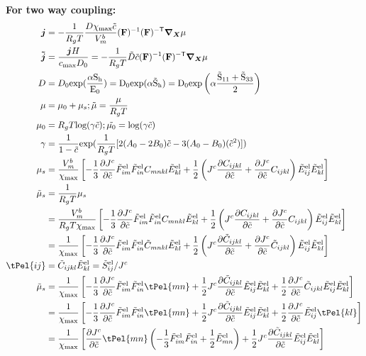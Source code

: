 \documentclass[../main.tex]{subfiles}
\begin{document}
\textbf{For two way coupling:}
\begin{align}
    \bm{j} &= - \fc{1}{R_g T} \fc{D\xmax \tc}{V^b_m} \inv{\F} \invT{\F} \nablaX \mu \\
    \bm{\td{j}} &= \frac{\bm{j} H}{\cmax D_0} =-\fc{1}{R_g T} \td{D} \tc \inv{\F} \invT{\F} \nablaX \mu \\
    D &= D_0 \rm{exp}(\fc{\alpha S_h}{E_0}) = D_0 \rm{exp}(\alpha \td{S}_h)= D_0 \rm{exp}\left(\alpha \frac{\td{S}_{11}+\td{S}_{33}}{2}\right) \\ 
    \mu &= \mu_0 + \mu_s; \td{\mu} = \frac{\mu}{R_g T} \\
    \mu_0 &= R_g T \text{log}(\gamma \td{c}); \td{\mu_0} = \text{log}(\gamma \td{c})\\
    \gamma &= \fc{1}{1-\td{c}}\text{exp}(\fc{1}{R_g T}[2(A_0 - 2B_0)\td{c} - 3(A_0 - B_0)(\td{c}^2)])\\
    \mu_s &= \fc{V_m^b}{\xmax}\left[-\fc{1}{3}\pdiff{\jc}{\tc}\tFel{im}\tFel{in}{C}_{mnkl}\tEel{kl} + \fc{1}{2}\left(\jc \pdiff{C_{ijkl}}{\tc} + \pdiff{\jc}{\tc} C_{ijkl}\right)\tEel{ij}\tEel{kl}\right] \\
    \td{\mu}_s &= \frac{1}{R_g T} \mu_s \\
        &= \fc{V_m^b}{R_g T \xmax}\left[-\fc{1}{3}\pdiff{\jc}{\tc}\tFel{im}\tFel{in}{C}_{mnkl}\tEel{kl} + \fc{1}{2}\left(\jc \pdiff{C_{ijkl}}{\tc} + \pdiff{\jc}{\tc} C_{ijkl}\right)\tEel{ij}\tEel{kl}\right] \\ 
        &= \fc{1}{\xmax}\left[-\fc{1}{3}\pdiff{\jc}{\tc}\tFel{im}\tFel{in}{\td{C}}_{mnkl}\tEel{kl} + \fc{1}{2}\left(\jc \pdiff{\td{C}_{ijkl}}{\tc} + \pdiff{\jc}{\tc} \td{C}_{ijkl}\right)\tEel{ij}\tEel{kl}\right] \\
    \tPel{ij} &= \td{C}_{ijkl} \tEel{kl} = \tSel{ij}/\jc \\
    \td{\mu}_s &= \fc{1}{\xmax}\left[-\fc{1}{3}\pdiff{\jc}{\tc}\tFel{im}\tFel{in}\tPel{mn} + \fc{1}{2}\jc \pdiff{\td{C}_{ijkl}}{\tc}\tEel{ij}\tEel{kl} + \fc{1}{2} \pdiff{\jc}{\tc} \td{C}_{ijkl}\tEel{ij}\tEel{kl}\right] \\
    &= \fc{1}{\xmax}\left[-\fc{1}{3}\pdiff{\jc}{\tc}\tFel{im}\tFel{in}\tPel{mn} + \fc{1}{2}\jc \pdiff{\td{C}_{ijkl}}{\tc}\tEel{ij}\tEel{kl} + \fc{1}{2} \pdiff{\jc}{\tc} \tEel{ij}\tPel{kl}\right] \\
    &= \fc{1}{\xmax}\left[\pdiff{\jc}{\tc} \tPel{mn} \left( -\fc{1}{3}\tFel{im}\tFel{in}+ \fc{1}{2} \tEel{mn}\right)+ \fc{1}{2}\jc \pdiff{\td{C}_{ijkl}}{\tc}\tEel{ij}\tEel{kl} \right] \\

\end{align}
\end{document}
